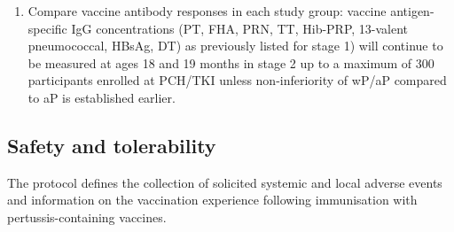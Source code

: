 \documentclass{bmcart}
\begin{document}
\begin{enumerate}[resume]
	\item Compare vaccine antibody responses in each study group:
	vaccine antigen-specific IgG concentrations (PT, FHA, PRN, TT, Hib-PRP, 13-valent pneumococcal, HBsAg, DT) 
	as previously listed for stage 1) will continue to be measured at ages 18 and 19 months in stage 2 up to a 
	maximum of 300 participants enrolled at PCH/TKI unless non-inferiority of wP/aP compared to aP is established earlier.
\end{enumerate}

\subsection*{Safety and tolerability}

The protocol defines the collection of solicited systemic and local adverse events and information on the vaccination experience following immunisation with pertussis-containing vaccines.
\end{document}
